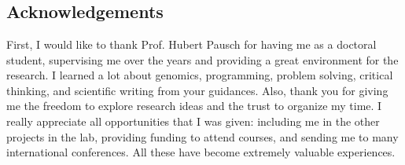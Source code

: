 \documentclass[11 pt, a4paper, notitlepage, twoside]{report}
\begin{document}
\newpage

\iftwoside
\cleardoublepage
\fi


\chapter*{}
\singlespacing
{}


\chapter*{}
\singlespacing
{}


\chapter*{}
\singlespacing
{}


\thispagestyle{plain}

\section*{\LARGE{Acknowledgements}}
\bigskip

\normalsize
\onehalfspacing
First, I would like to thank Prof. Hubert Pausch for having me as a doctoral student, 
supervising me over the years and providing a great environment for the research. 
I learned a lot about genomics, programming, problem solving, critical thinking, and scientific writing from your guidances.
Also, thank you for giving me the freedom to explore research ideas and the trust to organize my time. 
I really appreciate all opportunities that I was given: including me in the other projects in the lab, providing funding to attend courses, and sending me to many international conferences. 
All these have become extremely valuable experiences. \\
\end{document}
